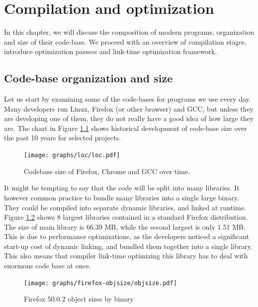 \newcommand{\definice}{\paragraph{Definice.}}

\chapter{Compilation and optimization}

In this chapter, we will discuss the composition of modern
programs, organization and size of their code-base. We proceed with an
overview of compilation stages, introduce optimization passses and link-time
optimization framework.

\section{Code-base organization and size}

Let us start by examining some of the code-bases for programs we use every day.
Many developers run Linux, Firefox (or other browser) and GCC, but
unless they are developing one of them, they do not really have a good idea of how large
they are. The chart in Figure \ref{figure-loc} shows historical development of
code-base size over the past 10 years for selected projects.

\begin{figure}[h!]
\centering
	\hspace{-1cm}\texttt{[image: graphs/loc/loc.pdf]}
\caption{Codebase size of Firefox, Chrome and GCC over time. }
\label{figure-loc}
\end{figure}

It might be tempting to say that the code will be split into many libraries. It
however common practice to bundle many libraries into a single large binary. They
could be compiled into separate dynamic libraries, and linked at runtime. Figure
\ref{figure-firefox-objsize} shows 8 largest libraries contained in a standard
Firefox distribution. The size of main library is 66.39 MB, while the second
largest is only 1.51 MB. This is due to performance optimizations, as the developers
noticed a significant start-up cost of dynamic linking, and
bundled them together into a single library. This also means that compiler
link-time optimizing this library has to deal with enormous code base at once.

\begin{figure}[h!]
\centering
\texttt{[image: graphs/firefox-objsize/objsize.pdf]}
\caption{Firefox 50.0.2 object sizes by binary}
\label{figure-firefox-objsize}
\end{figure}

